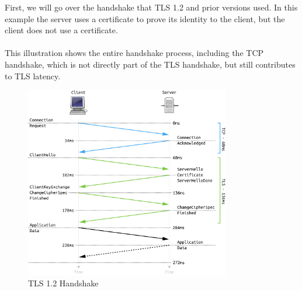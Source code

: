 First, we will go over the handshake that TLS 1.2 and prior versions used. In this example the server uses a certificate to prove its identity to the client, but the client does not use a certificate.
\\\\
This illustration shows the entire handshake process, including the TCP handshake, which is not directly part of the TLS handshake, but still contributes to TLS latency. 

\begin{figure}[H]
    \centering
    \includegraphics[width=0.8\textwidth]{Figures/Full_TLS_1_2_Handshake.png}
    \caption{TLS 1.2 Handshake}
    \label{fig:tls_handshake}
\end{figure}

